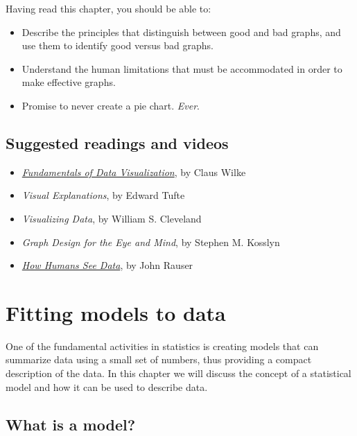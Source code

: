 \documentclass[12pt,]{book}
\providecommand{\tightlist}{%
  \setlength{\itemsep}{0pt}\setlength{\parskip}{0pt}}
\theoremstyle{definition}
\theoremstyle{definition}
\theoremstyle{definition}
\theoremstyle{remark}
\begin{document}
Having read this chapter, you should be able to:

\begin{itemize}
\tightlist
\item
  Describe the principles that distinguish between good and bad graphs, and use them to identify good versus bad graphs.
\item
  Understand the human limitations that must be accommodated in order to make effective graphs.
\item
  Promise to never create a pie chart. \emph{Ever}.
\end{itemize}

\hypertarget{suggested-readings-and-videos}{%
\section{Suggested readings and videos}\label{suggested-readings-and-videos}}

\begin{itemize}
\tightlist
\item
  \href{https://serialmentor.com/dataviz/}{\emph{Fundamentals of Data Visualization}}, by Claus Wilke
\item
  \emph{Visual Explanations}, by Edward Tufte
\item
  \emph{Visualizing Data}, by William S. Cleveland
\item
  \emph{Graph Design for the Eye and Mind}, by Stephen M. Kosslyn
\item
  \href{https://www.youtube.com/watch?v=fSgEeI2Xpdc\&feature=youtu.be}{\emph{How Humans See Data}}, by John Rauser
\end{itemize}

\hypertarget{fitting-models}{%
\chapter{Fitting models to data}\label{fitting-models}}

One of the fundamental activities in statistics is creating models that can summarize data using a small set of numbers, thus providing a compact description of the data. In this chapter we will discuss the concept of a statistical model and how it can be used to describe data.

\hypertarget{what-is-a-model}{%
\section{What is a model?}\label{what-is-a-model}}
\end{document}
